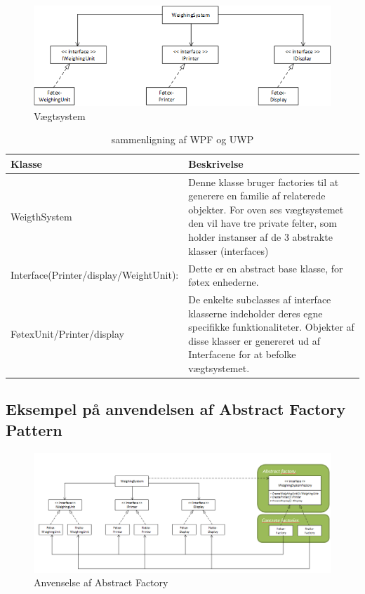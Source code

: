 \documentclass[../report.tex]{subfiles}
\begin{document}
\begin{figure}[H]
    \centering
    \includegraphics[width = \textwidth]{pics/weight_system.PNG}
    \caption{Vægtsystem}
    \label{fig:weight_system}
\end{figure}


\begin{table}[H]
    \centering
    \begin{tabular}{l|p{}}
        Klasse          & Beskrivelse        \\ \toprule
        WeigthSystem                & Denne klasse bruger factories til at generere en familie af relaterede objekter. For oven ses vægtsystemet den vil have tre private felter, som holder instanser af de 3 abstrakte klasser (interfaces)    \\ \midrule
        Interface(Printer/display/WeightUnit): & Dette er en abstract base klasse, for føtex enhederne.          \\ \midrule
        FøtexUnit/Printer/display    & De enkelte subclasses af interface klasserne indeholder deres egne specifikke funktionaliteter. Objekter af disse klasser er genereret ud af Interfacene for at befolke vægtsystemet. \\ \bottomrule
    \end{tabular}
    \caption{sammenligning af WPF og UWP}\label{tab:wpfVSuwp}
\end{table}

\subsection*{Eksempel på anvendelsen af Abstract Factory Pattern}
\begin{figure}[H]
    \centering
    \includegraphics[width = \textwidth]{pics/usage_abstract_factory.PNG}
    \caption{Anvenselse af Abstract Factory}
    \label{fig:usage_abstract_factory}
\end{figure}
\end{document}
